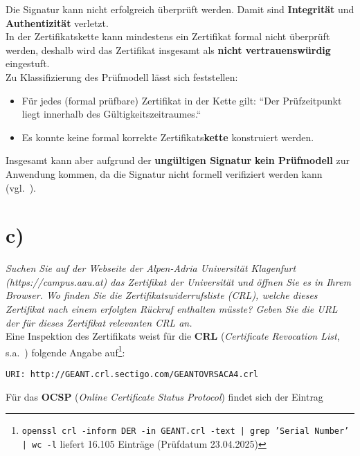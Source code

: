 \noindent
Die Signatur kann nicht erfolgreich überprüft werden.
Damit sind \textbf{Integrität} und \textbf{Authentizität} verletzt.\\

\noindent
In der Zertifikatskette kann mindestens ein Zertifikat formal nicht überprüft werden, deshalb wird das Zertifikat insgesamt als \textbf{nicht vertrauenswürdig} eingestuft.\\

\noindent
Zu Klassifizierung des Prüfmodell lässt sich feststellen:

\begin{itemize}
    \itemsep0.5em
    \item Für jedes (formal prüfbare) Zertifikat in der Kette gilt: ``Der Prüfzeitpunkt liegt innerhalb des Gültigkeitszeitraumes.``
    \item Es konnte keine formal korrekte Zertifikats\textbf{kette} konstruiert werden.
\end{itemize}

\noindent
Insgesamt kann aber aufgrund der \textbf{ungültigen Signatur} \textbf{kein Prüfmodell} zur Anwendung kommen, da die Signatur nicht formell verifiziert werden kann (vgl.~\cite[27]{ITS6}).

\section{c)}

\textit{Suchen Sie auf der Webseite der Alpen-Adria Universität Klagenfurt
    (https://campus.aau.at) das Zertifikat der Universität und öffnen Sie es in Ihrem
    Browser. Wo finden Sie die Zertifikatswiderrufsliste (CRL), welche dieses Zertifikat nach einem erfolgten Rückruf enthalten müsste? Geben Sie die URL der für dieses Zertifikat relevanten CRL an.}\\

\noindent
Eine Inspektion des Zertifikats weist für die \textbf{CRL} (\textit{Certificate Revocation List}, s.a.~\cite[35 f.]{ITS6}) folgende Angabe auf\footnote{
\texttt{openssl crl -inform DER -in GEANT.crl -text | grep 'Serial Number' | wc -l} liefert 16.105 Einträge (Prüfdatum 23.04.2025)
}:

\begin{center}
    \texttt{URI: http://GEANT.crl.sectigo.com/GEANTOVRSACA4.crl}
\end{center}

\noindent
Für das \textbf{OCSP} (\textit{Online Certificate Status Protocol}) findet sich der Eintrag

